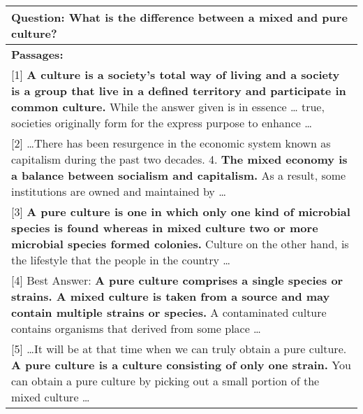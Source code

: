 \documentclass[11pt,a4paper]{article}
\begin{document}
\begin{comment}
  \\
\hline
\textbf{Gold Answer:} Any frequency higher than the fundamental frequency of a sound. \\
\hline
\end{tabular}
\caption{An example from MS-MARCO. The text in bold is the top-1 predicted answer candidate from each passage according to the boundary model. The candidate from passage [4] is chosen as the final prediction by the model, while the correct answer is from passage [3] and can be verified by the answers from [1], [2]. } \label{tab:example}
\end{table*}
\end{comment}


\begin{table*}[htbp]
\small
\centering
\renewcommand{\arraystretch}{1.2}
\begin{tabular}{p{\textwidth}}
\hline
\textbf{Question: } What is the difference between a mixed and pure culture? \\
\hline
\textbf{Passages:} \\

[1] \textbf{A culture is a society's total way of living and a society is a group that live in a defined territory and participate in common culture.} While the answer given is in essence … true, societies originally form for the express purpose to enhance \ldots \\

[2] \ldots There has been resurgence in the economic system known as capitalism during the past two decades. 4. \textbf{The mixed economy is a balance between socialism and capitalism.} As a result, some institutions are owned and maintained by \ldots \\

[3] \textbf{A pure culture is one in which only one kind of microbial species is found whereas in mixed culture two or more microbial species formed colonies.} Culture on the other hand, is the lifestyle that the people in the country \ldots \\

[4] Best Answer: \textbf{A pure culture comprises a single species or strains. A mixed culture is taken from a source and may contain multiple strains or species.} A contaminated culture contains organisms that derived from some place \ldots \\

[5] \ldots It will be at that time when we can truly obtain a pure culture. \textbf{A pure culture is a culture consisting of only one strain.} You can obtain a pure culture by picking out a small portion of the mixed culture \ldots \\


\end{tabular}
\end{table*}
\end{document}
